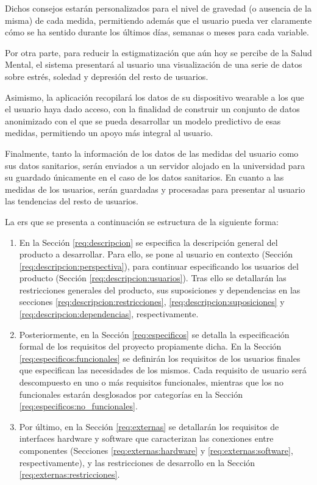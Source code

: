     Dichos consejos estarán personalizados para el nivel de gravedad (o ausencia de la misma) de cada medida, permitiendo además que el usuario pueda ver claramente cómo se ha sentido durante los últimos días, semanas o meses para cada variable.

    Por otra parte, para reducir la estigmatización que aún hoy se percibe de la Salud Mental, el sistema presentará al usuario una visualización de una serie de datos sobre estrés, soledad y depresión del resto de usuarios.

    Asimismo, la aplicación recopilará los datos de su dispositivo \gls{wearable} a los que el usuario haya dado acceso, con la finalidad de construir un conjunto de datos anonimizado con el que se pueda desarrollar un modelo predictivo de esas medidas, permitiendo un apoyo más integral al usuario. 

    Finalmente, tanto la información de los datos de las medidas del usuario como sus datos sanitarios, serán enviados a un servidor alojado en la universidad para su guardado únicamente en el caso de los datos sanitarios. En cuanto a las medidas de los usuarios, serán guardadas y procesadas para presentar al usuario las tendencias del resto de usuarios.

   La \gls{ers} que se presenta a continuación se estructura de la siguiente forma:

    \begin{enumerate}
        \item En la Sección \ref{req:descripcion} se especifica la descripción general del producto a desarrollar. Para ello, se pone al usuario en contexto (Sección \ref{req:descripcion:perspectiva}), para continuar especificando los usuarios del producto (Sección \ref{req:descripcion:usuarios}). Tras ello se detallarán las restricciones generales del producto, sus suposiciones y dependencias en las secciones 
        \ref{req:descripcion:restricciones}, \ref{req:descripcion:suposiciones} y \ref{req:descripcion:dependencias}, respectivamente.
        \item Posteriormente, en la Sección \ref{req:especificos} se detalla la especificación formal de los requisitos del proyecto propiamente dicha. En la Sección \ref{req:especificos:funcionales} se definirán los requisitos de los usuarios finales que especifican las necesidades de los mismos. Cada requisito de usuario será descompuesto en uno o más requisitos funcionales, mientras que los no funcionales estarán desglosados por categorías en la Sección \ref{req:especificos:no_funcionales}.
        \item Por último, en la Sección \ref{req:externas} se detallarán los requisitos de interfaces hardware y software que caracterizan las conexiones entre componentes (Secciones \ref{req:externas:hardware} y \ref{req:externas:software}, respectivamente), y las restricciones de desarrollo en la Sección \ref{req:externas:restricciones}.
    \end{enumerate}
    
